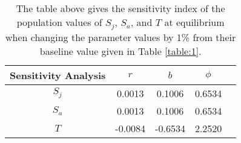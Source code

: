 \begin{table}[H]
\begin{center}
\begin{tabular}{|c|c|c|c|c|}\hline
{Sensitivity Analysis}
& $r$ & $b$ & $\phi$\\
\hline
$S_j$ &  0.0013& 0.1006 & 0.6534\\
\hline
$S_a$ & 0.0013 & 0.1006 & 0.6534\\
\hline
$T$ & -0.0084 & -0.6534 & 2.2520\\
\hline
\end{tabular}
\caption{The table above gives the sensitivity index of the population values of $S_j$, $S_a$, and $T$ at equilibrium when changing the parameter values by 1\% from their baseline value given in Table \ref{table:1}.}
\label{table:NormalSensitivity}
\end{center}
\end{table}